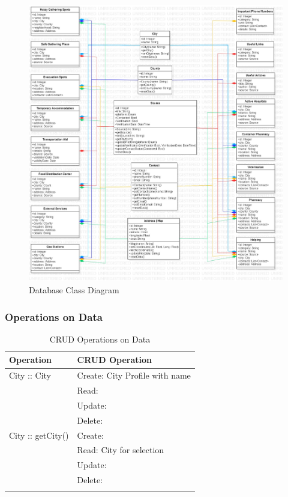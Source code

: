 \begin{figure}[H]
  \centering
  \includegraphics[width=\linewidth]{img/database-class-diagram.jpg}
  \caption{Database Class Diagram}
\end{figure}

\subsubsection{Operations on Data}

\begin{longtable}{|p{.3\linewidth}|p{.7\linewidth}|}
    \hline
    Operation & CRUD Operation \\ \hline
    City :: City & Create: City Profile with name \\
               & Read: \\
               & Update: \\
               & Delete: \\ \hline
    City :: getCity() & Create: \\
                     & Read: City for selection \\
                     & Update: \\
                     & Delete: \\ \hline
  \caption{CRUD Operations on Data}
\end{longtable}

